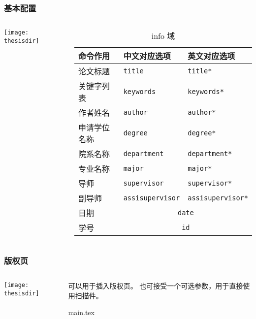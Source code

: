 \begin{frame}[label=setup]
  \frametitle{基本配置}
  \begin{columns}
    \begin{column}{0.35\textwidth}
      \texttt{[image: thesisdir]}
    \end{column}
    \begin{column}{0.65\textwidth}
      \begin{table}
        \centering
        \caption{info 域}
        \footnotesize
        \begin{tabular}{lll} \toprule
          命令作用     & 中文对应选项                      & 英文对应选项             \\ \midrule
          论文标题     & \texttt{title}                    & \texttt{title*}          \\
          关键字列表   & \texttt{keywords}                 & \texttt{keywords*}       \\
          作者姓名     & \texttt{author}                   & \texttt{author*}         \\
          申请学位名称 & \texttt{degree}                   & \texttt{degree*}         \\
          院系名称     & \texttt{department}               & \texttt{department*}     \\
          专业名称     & \texttt{major}                    & \texttt{major*}          \\
          导师         & \texttt{supervisor}               & \texttt{supervisor*}     \\
          副导师       & \texttt{assisupervisor}           & \texttt{assisupervisor*} \\
          日期         & \multicolumn{2}{c}{\texttt{date}}                            \\
          学号         & \multicolumn{2}{c}{\texttt{id}}                              \\ \bottomrule
        \end{tabular}
      \end{table}
    \end{column}
  \end{columns}
\end{frame}

\begin{frame}[fragile]
  \frametitle{版权页}
  \begin{columns}
    \begin{column}{0.4\textwidth}
      \texttt{[image: thesisdir]}
    \end{column}
    \begin{column}{0.6\textwidth}
       可以用于插入版权页。
      也可接受一个可选参数，用于直接使用扫描件。

      \begin{codeblock}[firstnumber=22]{main.tex}
\copyrightpage
      \end{codeblock}
    \end{column}
  \end{columns}
\end{frame}

